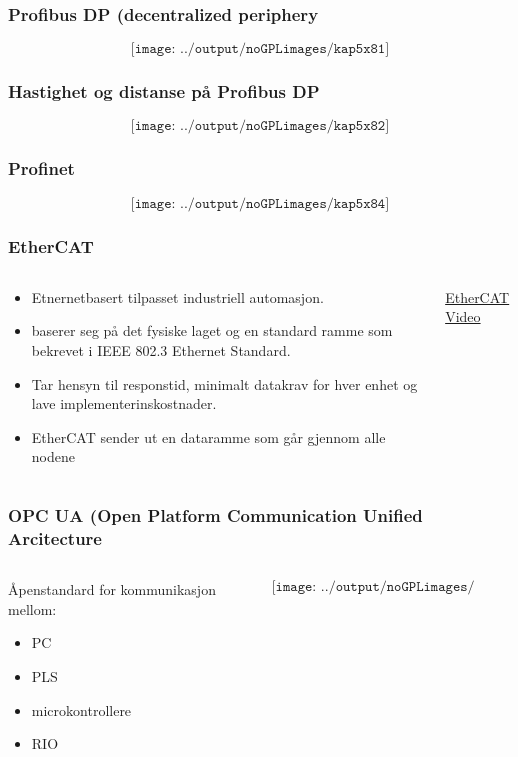 \documentclass[aspectratio=169,xcolor=dvipsnames]{beamer}
\begin{document}
\begin{frame}
	\frametitle{Profibus DP (decentralized periphery}
	$$\texttt{[image: ../output/noGPLimages/kap5x81]}$$
\end{frame}
\begin{frame}
	\frametitle{Hastighet og distanse på Profibus DP}
	$$\texttt{[image: ../output/noGPLimages/kap5x82]}$$
\end{frame}
\begin{frame}
	\frametitle{Profinet}
	$$\texttt{[image: ../output/noGPLimages/kap5x84]}$$
\end{frame}
\begin{frame}
	\frametitle{EtherCAT}
	\begin{columns}
		\begin{column}{0.5\textwidth}

			\begin{itemize}
				\item Etnernetbasert tilpasset industriell automasjon. 
				\item baserer seg på det fysiske laget og en standard ramme som bekrevet i IEEE 802.3 Ethernet Standard. 
				\item Tar hensyn til responstid, minimalt datakrav for hver enhet og lave implementerinskostnader. 
				\item EtherCAT sender ut en dataramme som går gjennom alle nodene
			\end{itemize}

			
		\end{column}

		\begin{column}{0.5\textwidth}
			\href{https://www.youtube.com/watch?v=z2OagcHG-UU}{EtherCAT Video}
		\end{column}
	\end{columns}
\end{frame}
\begin{frame}
	\frametitle{OPC UA (Open Platform Communication Unified Arcitecture}
	\begin{columns}
		\begin{column}{0.5\textwidth}

				Åpenstandard for kommunikasjon mellom:
			\begin{itemize}
				\item PC
				\item PLS
				\item microkontrollere
				\item RIO
			\end{itemize}

			
		\end{column}

		\begin{column}{0.5\textwidth}
	$$\texttt{[image: ../output/noGPLimages/kap5x86]}$$
		\end{column}
	\end{columns}
\end{frame}
\end{document}
